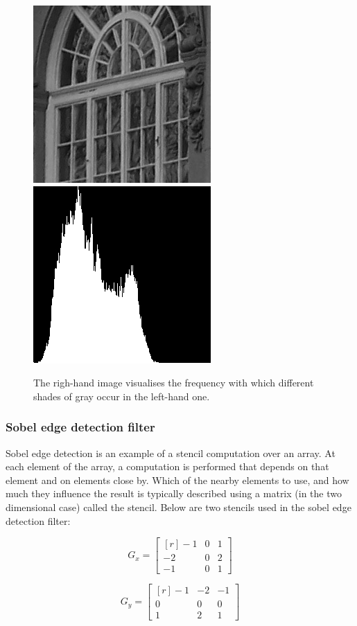 \begin{figure} 
\includegraphics[width=.5\linewidth]{./embarbb/img/window}
\includegraphics[width=.5\linewidth]{./embarbb/img/histogram}
\caption{ The righ-hand image visualises the frequency with which 
          different shades of gray occur in the left-hand one.}
\label{fig:histogram}
\end{figure} 

\FloatBarrier
\subsubsection{Sobel edge detection filter}
\label{sec:Sobel}
\FloatBarrier 

Sobel edge detection is an example of a stencil computation
over an array. At each element of the array, a computation is 
performed that depends on that element and on elements close by. Which of the nearby 
elements to use, and how much they influence the result is typically described using a matrix 
(in the two dimensional case) called the stencil. Below are two stencils used in the 
sobel edge detection filter: 

\begin{minipage}{0.5\linewidth}
\[
G_x = \begin{bmatrix*}[r]
        -1 & 0 & 1 \\ 
        -2 & 0 & 2 \\
        -1 & 0 & 1 
      \end{bmatrix*}
\]
\end{minipage}
\begin{minipage}{0.5\linewidth}\centering
\[
G_y = \begin{bmatrix*}[r]
        -1 & -2 & -1 \\ 
         0 &  0 &  0 \\
         1 &  2 &  1 
      \end{bmatrix*}
\]
\end{minipage}

